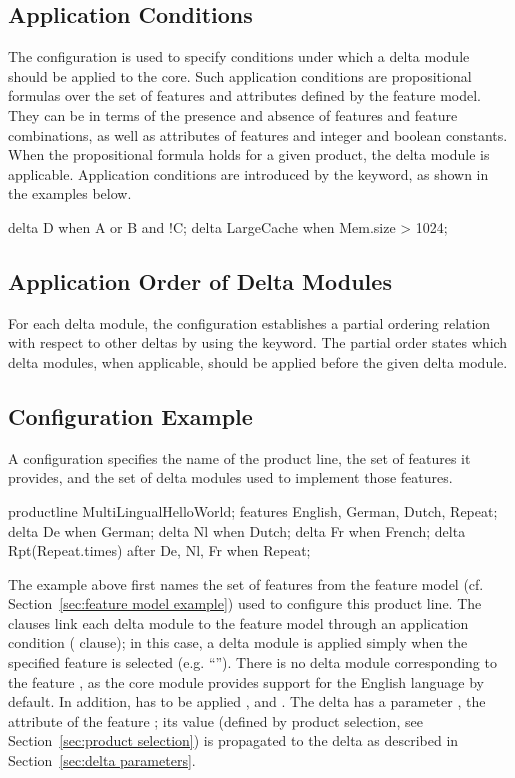 \subsection{Application Conditions}
\label{sec:application conditions}
The configuration is used to specify conditions under which a delta module
should be applied to the core. Such application conditions are propositional
formulas over the set of features and attributes defined by the feature model.
They can be in terms of the presence and absence of features and feature
combinations, as well as attributes of features and integer and boolean
constants. When the propositional formula holds for a given product, the delta
module is applicable. Application conditions are introduced by the 
keyword, as shown in the examples below.
\begin{absexample}
delta D when A or B and !C;
delta LargeCache when Mem.size > 1024;
\end{absexample}

\subsection{Application Order of Delta Modules}
\label{sec:delta ordering}
For each delta module, the configuration establishes a partial ordering relation
with respect to other deltas by using the  keyword. The partial
order states which delta modules, when applicable, should be applied before the
given delta module.


\subsection{Configuration Example}
A configuration specifies the name of the product line, the set of
features it provides, and the set of delta modules used to implement those
features.

\begin{absexample}
productline MultiLingualHelloWorld;
    features English, German, Dutch, Repeat;
    delta De when German;
    delta Nl when Dutch;
    delta Fr when French;
    delta Rpt(Repeat.times) after De, Nl, Fr when Repeat;
\end{absexample}

The example above first names the set of features from the feature model (cf.
Section~\ref{sec:feature model example}) used to configure this product line.
The  clauses link each delta module to the feature model
through an application condition ( clause); in this case, a
delta module is applied simply when the specified feature is selected (e.g.
``''). There is no delta module corresponding to the
feature , as the core module provides support for the English
language by default. In addition,  has to be applied
 ,  and .
The  delta has a parameter , the
 attribute of the feature ; its value
(defined by product selection, see Section~\ref{sec:product selection}) is
propagated to the  delta as described in Section~\ref{sec:delta parameters}.



